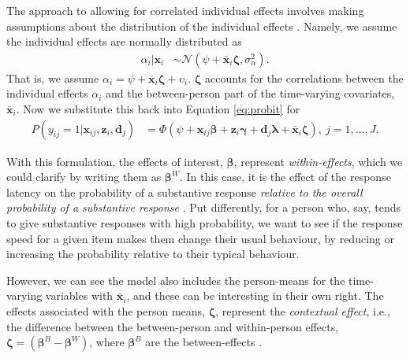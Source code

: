 \documentclass[Royal,times,sageh]{sagej}
\begin{document}
The \citet{Mundlak1978} approach to allowing for correlated individual
effects involves making assumptions about the distribution of the
individual effects \citep[p.~487]{Wooldridge2002}. Namely, we assume the
individual effects are normally distributed as \begin{align}
\alpha_{i} | \bm{x}_{i} & \sim \mathcal{N}(\psi + \bar{\bm{x}}_{i}\bm{\zeta}, \sigma^{2}_{\alpha}).
\end{align} That is, we assume
\(\alpha_{i} = \psi + \bar{\bm{x}}_{i}\bm{\zeta} + \upsilon_{i}\).
\(\bm{\zeta}\) accounts for the correlations between the individual
effects \(\alpha_{i}\) and the between-person part of the time-varying
covariates, \(\bar{\bm{x}}_{i}\). Now we substitute this back into
Equation \eqref{eq:probit} for \begin{align}
P(y_{ij} = 1 | \bm{x}_{ij}, \bm{z}_{i}, \bm{d}_{j}) & = \Phi(\psi + \bm{x}_{ij}\bm{\beta} + \bm{z}_{i}\bm{\gamma} + \bm{d}_{j}\bm{\lambda} + \bar{\bm{x}}_{i}\bm{\zeta}), \ j = 1, \ldots, J. \label{eq:context}
\end{align}

With this formulation, the effects of interest, \(\bm{\beta}\),
represent \emph{within-effects}, which we could clarify by writing them
as \(\bm{\beta}^{W}\). In this case, it is the effect of the response
latency on the probability of a substantive response \emph{relative to
the overall probability of a substantive response} \citep{Bell2015}. Put
differently, for a person who, say, tends to give substantive responses
with high probability, we want to see if the response speed for a given
item makes them change their usual behaviour, by reducing or increasing
the probability relative to their typical behaviour.

However, we can see the model also includes the person-means for the
time-varying variables with \(\bar{\bm{x}}_{i}\), and these can be
interesting in their own right. The effects associated with the person
means, \(\bm{\zeta}\), represent the \emph{contextual effect}, i.e., the
difference between the between-person and within-person effects,
\(\bm{\zeta} = (\bm{\beta}^{B} - \bm{\beta}^{W})\), where
\(\bm{\beta}^{B}\) are the between-effects
\citep{Bell2015, Schunck2017}.
\end{document}

